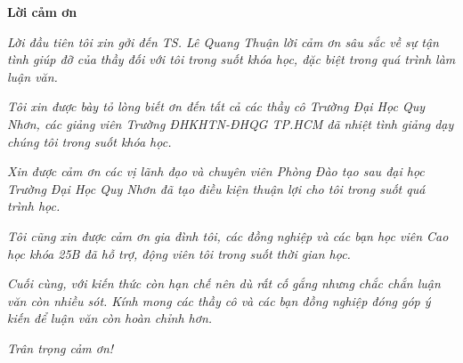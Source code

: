 \newpage
\thispagestyle{empty}
\begin{center}
    \Large{\textbf{Lời cảm ơn}}
\end{center}
\vspace{0.8cm}

\textit{Lời đầu tiên tôi xin gởi đến TS. Lê Quang Thuận lời cảm ơn sâu sắc về sự tận tình giúp đỡ của thầy đối với tôi trong suốt khóa học, đặc biệt trong quá trình làm luận văn.}

\textit{Tôi xin được bày tỏ lòng biết ơn đến tất cả các thầy cô Trường Đại Học Quy Nhơn, các giảng viên Trường ĐHKHTN-ĐHQG TP.HCM đã nhiệt tình giảng dạy chúng tôi trong suốt khóa học.}

\textit{Xin được cảm ơn các vị lãnh đạo và chuyên viên Phòng Đào tạo sau đại học Trường Đại Học Quy Nhơn đã tạo điều kiện thuận lợi cho tôi trong suốt quá trình học.}

\textit{Tôi cũng xin được cảm ơn gia đình tôi, các đồng nghiệp và các bạn học viên Cao học khóa 25B đã hỗ trợ, động viên tôi trong suốt thời gian học.}

\textit{Cuối cùng, với kiến thức còn hạn chế nên dù rất cố gắng nhưng chắc chắn luận văn còn nhiều sót. Kính mong các thầy cô và các bạn đồng nghiệp đóng góp ý kiến để luận văn còn hoàn chỉnh hơn.}
\vspace{.6cm}

\textit{Trân trọng cảm ơn!}